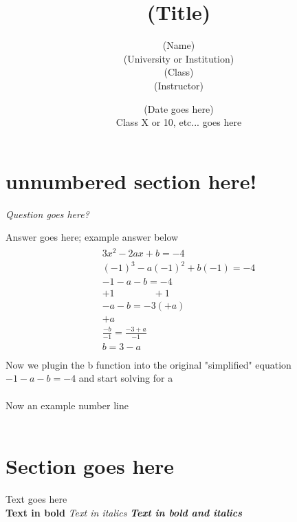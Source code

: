 \documentclass[11pt]{article} %
\title{(Title)}
\author{(Name) \\ (University or Institution) \\ (Class) \\ (Instructor)}
\date{(Date goes here) \\ Class X or 10, etc... goes here}
\begin{document}
\maketitle
\section*{unnumbered section here!}

\begin{Exercise} \emph{Question goes here?}
\end{Exercise}
\begin{Answer}
Answer goes here; example answer below
\begin{equation}
	\begin {gathered}
		\begin{aligned}
		3x^2-2ax+b=-4 \\
		(-1)^3-a(-1)^2+b(-1)=-4 \\
		-1-a-b=-4 \\
		+1\qquad \qquad+1 \\
		-a -b = -3(+a) \\
		+a\qquad \qquad \qquad \\
		\frac{-b}{-1} = \frac{-3+a}{-1} \\
		b=3-a \\
		\nonumber
		\end{aligned}
	\end {gathered}
\end{equation}
Now we plugin the b function into the original "simplified" equation \(-1-a-b=-4\) and start solving for a\\
\\
Now an example number line\\\\

\end{Answer}

\section{Section goes here}
Text goes here\\

\textbf{Text in bold}
\textit{Text in italics}
\textbf{\textit{Text in bold and italics}} %
\end{document}
